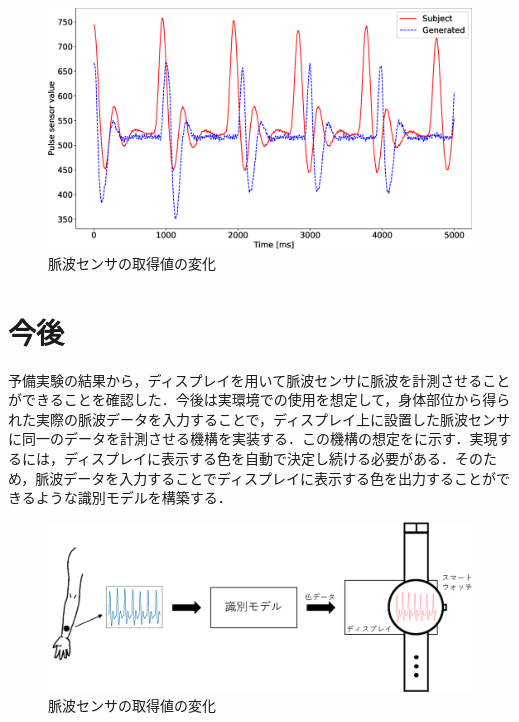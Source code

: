 \documentclass[Japanese,noauthor]{dicomopapers}
\begin{document}
\begin{figure}[!t]
  \begin{center}
    \includegraphics[width=1\linewidth]{figures/pulse.eps}
  \end{center}
  \caption{脈波センサの取得値の変化}
  \label{fig:pulse}
\end{figure}


\section{今後}
\label{future_work}
予備実験の結果から，ディスプレイを用いて脈波センサに脈波を計測させることができることを確認した．今後は実環境での使用を想定して，身体部位から得られた実際の脈波データを入力することで，ディスプレイ上に設置した脈波センサに同一のデータを計測させる機構を実装する．この機構の想定をに示す．実現するには，ディスプレイに表示する色を自動で決定し続ける必要がある．そのため，脈波データを入力することでディスプレイに表示する色を出力することができるような識別モデルを構築する．

\begin{figure}[!t]
  \begin{center}
    \includegraphics[width=1\linewidth]{figures/future_work.eps}
  \end{center}
  \caption{脈波センサの取得値の変化}
  \label{fig:future_work}
\end{figure}
\end{document}
